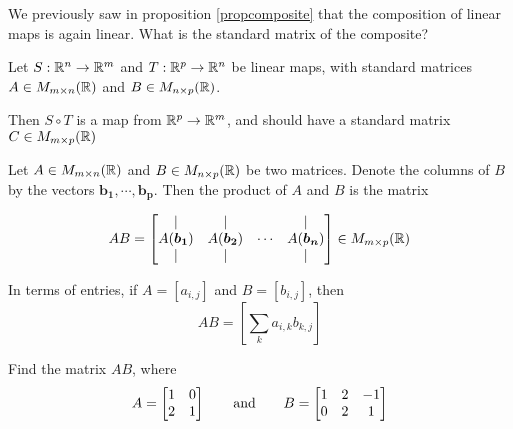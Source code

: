 \begin{motivating}
We previously saw in proposition \ref{propcomposite} that the composition of linear maps is again linear.  What is the standard matrix of the composite?
\end{motivating}

Let $S: \mathbb{R}^n \to \mathbb{R}^m$ and $T : \mathbb{R}^p \to \mathbb{R}^n$ be linear maps, with standard matrices $A \in M_{m \times n}(\mathbb{R})$ and $B \in M_{n \times p}(\mathbb{R})$.

Then $S \circ T$ is a map from $\mathbb{R}^p \to \mathbb{R}^m$, and should have a standard matrix $C \in M_{m \times p}(\mathbb{R})$

\begin{definition}
    
    Let $A \in M_{m \times n}(\mathbb{R})$ and $B \in M_{n \times p}(\mathbb{R})$ be two matrices.  Denote the columns of $B$ by the vectors $\bm{b_1}, \cdots, \bm{b_p}$.  Then the product of $A$ and $B$ is the matrix
    
    \begin{equation*}
AB = 
\begin{bmatrix}
\vert & \vert & & \vert \\
    A(\bm{b_1})   & A(\bm{b_2}) & \cdots & A(\bm{b_n})  \\
    \vert & \vert & & \vert
\end{bmatrix} \in M_{m \times p}(\mathbb{R})
\end{equation*}
    
    
    In terms of entries, if $A = [a_{i,j}]$ and $B = [b_{i,j}]$, then $$AB = \left[\sum_k a_{i,k}b_{k,j}\right]$$
    
\end{definition}

\begin{example}
    Find the matrix $AB$, where \begin{equation*}
A = 
\begin{bmatrix}
1 & 0 \\
2 & 1
\end{bmatrix} \qquad \textnormal{and} \qquad B = 
\begin{bmatrix}
1 & 2 & -1 \\
0 & 2 & 1
\end{bmatrix}
\end{equation*}
\end{example}



